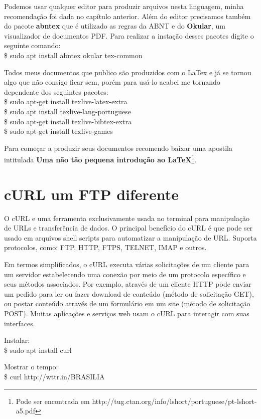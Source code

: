Podemos usar qualquer editor para produzir arquivos nesta linguagem, minha recomendação foi dada no capítulo anterior. Além do editor precisamos também do pacote \textbf{abntex} que é utilizado as regras da ABNT e do \textbf{Okular}, um visualizador de documentos PDF. Para realizar a instação desses pacotes digite o seguinte comando: \\
{\ttfamily\$ sudo apt install abntex okular tex-common}

Todos meus documentos que publico são produzidos com o LaTex e já se tornou algo que não consigo ficar sem, porém para usá-lo acabei me tornando dependente dos seguintes pacotes: \\
{\ttfamily\$ sudo apt-get install texlive-latex-extra \\
\$ sudo apt install texlive-lang-portuguese \\
\$ sudo apt-get install texlive-bibtex-extra \\
\$ sudo apt-get install texlive-games}

Para começar a produzir seus documentos recomendo baixar uma apostila intitulada \textbf{Uma não tão pequena introdução ao LaTeX}\footnote{Pode ser encontrada em http://tug.ctan.org/info/lshort/portuguese/pt-lshort-a5.pdf}.

\section{cURL um FTP diferente}
O cURL e uma ferramenta exclusivamente usada no terminal para manipulação de URLs e transferência de dados. O principal benefício do cURL é que pode ser usado em arquivos shell scripts para automatizar a manipulação de URL. Suporta protocolos, como: FTP, HTTP, FTPS, TELNET, IMAP e outros.

Em termos simplificados, o cURL executa várias solicitações de um cliente para um servidor estabelecendo uma conexão por meio de um protocolo específico e seus métodos associados. Por exemplo, através de um cliente HTTP pode enviar um pedido para ler ou fazer download de conteúdo (método de solicitação GET), ou postar conteúdo através de um formulário em um site (método de solicitação POST). Muitas aplicações e serviços web usam o cURL para interagir com suas interfaces.

Instalar: \\
{\ttfamily\$ sudo apt install curl}

Mostrar o tempo: \\
{\ttfamily\$ curl http://wttr.in/BRASILIA}

